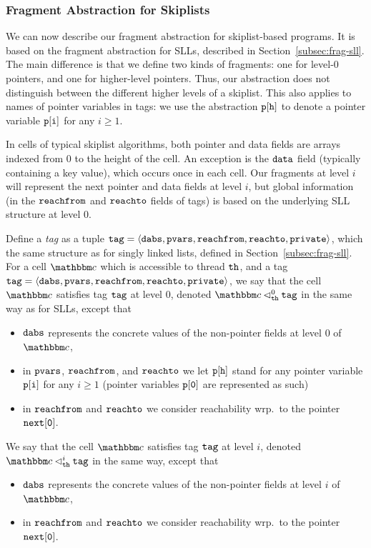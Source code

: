 \subsubsection{Fragment Abstraction for Skiplists}
We can now describe our fragment abstraction for skiplist-based programs.
It is based on the fragment abstraction for SLLs, described in
Section~\ref{subsec:frag-sll}. The main difference is that we define two
kinds of fragments: one for level-$0$ pointers, and one for higher-level
pointers. Thus, our abstraction does not distinguish between the different
higher levels of a skiplist. This also applies to names of pointer
variables in  tags: we use the abstraction $\mathtt{p[h]}$ to denote a
pointer variable $\mathtt{p[i]}$ for any $i \geq 1$.

In cells of typical skiplist algorithms, both pointer and data fields
are arrays indexed from $0$ to the height of the cell. An exception is
the $\tt data$ field (typically containing a key value), which occurs once
in each cell. Our fragments at level $i$ will represent the next pointer
and data fields at level $i$, but global information (in the
$\mathtt{reachfrom}$ and $\mathtt{reachto}$ fields of tags) is based on
the underlying SLL structure at level $0$.


Define a {\em tag} as a tuple $\mathtt{tag} = \left\langle\mathtt{dabs},\mathtt{pvars},\mathtt{reachfrom},\mathtt{reachto},\mathtt{private}\right\rangle$, which the same
structure as for singly linked lists, defined in Section~\ref{subsec:frag-sll}.
For a cell $\cell$ which is accessible to thread ${\tt th}$, and a tag
$\mathtt{tag} = \left\langle\mathtt{dabs},\mathtt{pvars},\mathtt{reachfrom},\mathtt{reachto},\mathtt{private}\right\rangle$, we say that
the cell $\cell$ satisfies tag $\mathtt{tag}$ at level $0$, denoted
$\cell \satslfrag{\thread}{0} \atag$ in the same way as for SLLs, except that
\begin{itemize}
\item
  $\mathtt{dabs}$ represents the concrete values of the non-pointer fields
  at level $0$ of $\cell$,
\item
  in $\mathtt{pvars}$, $\mathtt{reachfrom}$, and $\mathtt{reachto}$ we let 
  $\mathtt{p[h]}$ stand for any
  pointer variable $\mathtt{p[i]}$ for any $i \geq 1$
  (pointer variables $\mathtt{p[0]}$ are represented as such)
\item
  in $\mathtt{reachfrom}$ and $\mathtt{reachto}$ we consider reachability
  wrp.\ to the pointer $\tt next[0]$.
\end{itemize}
We say that the cell $\cell$ satisfies tag $\mathtt{tag}$ at level $i$, denoted
$\cell \satslfrag{\thread}{i} \atag$ in the same way, except that
\begin{itemize}
\item
  $\mathtt{dabs}$ represents the concrete values of the non-pointer fields
  at level $i$ of $\cell$,
\item
  in $\mathtt{reachfrom}$ and $\mathtt{reachto}$ we consider reachability
  wrp.\ to the pointer $\tt next[0]$.
\end{itemize}

